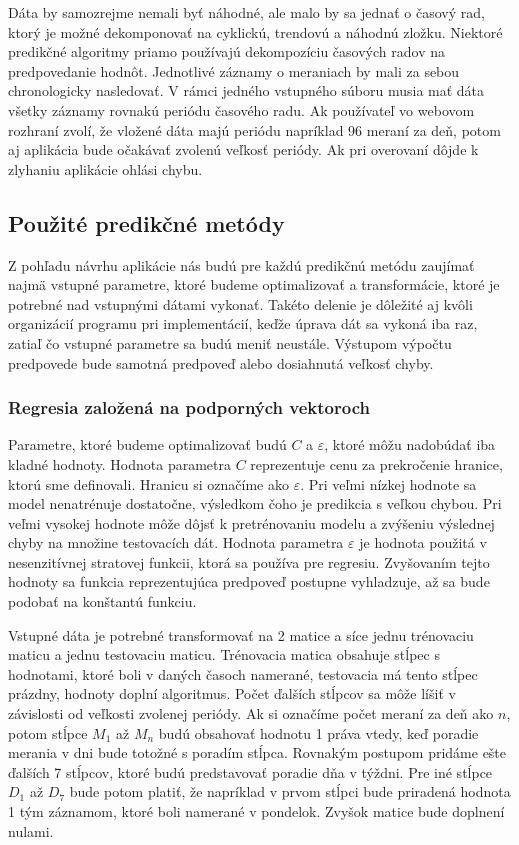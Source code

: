 \documentclass[a4paper,slovak,12pt,appendix]{article}
\begin{document}
Dáta by samozrejme nemali byť náhodné, ale malo by sa jednať o časový rad,
ktorý je možné dekomponovať na cyklickú, trendovú a náhodnú zložku. Niektoré
predikčné algoritmy priamo používajú dekompozíciu časových radov na
predpovedanie hodnôt. Jednotlivé záznamy o meraniach by mali za sebou
chronologicky nasledovať. V rámci jedného vstupného súboru musia mať dáta
všetky záznamy rovnakú periódu časového radu. Ak používateľ vo webovom rozhraní
zvolí, že vložené dáta majú periódu napríklad 96 meraní za deň, potom aj aplikácia
bude očakávať zvolenú veľkosť periódy. Ak pri overovaní dôjde k zlyhaniu
aplikácie ohlási chybu.


\subsection{Použité predikčné metódy}
Z pohľadu návrhu aplikácie nás budú pre každú predikčnú metódu zaujímať najmä
vstupné parametre, ktoré budeme optimalizovať a transformácie, ktoré je
potrebné nad vstupnými dátami vykonať. Takéto delenie je dôležité aj kvôli
organizácií programu pri implementácií, keďže úprava dát sa vykoná iba raz,
zatiaľ čo vstupné parametre sa budú meniť neustále. Výstupom výpočtu predpovede
bude samotná predpoveď alebo dosiahnutá veľkosť chyby.

\subsubsection{Regresia založená na podporných vektoroch}
Parametre, ktoré budeme optimalizovať budú $C$ a $\varepsilon$, ktoré môžu
nadobúdať iba kladné hodnoty. Hodnota parametra $C$ reprezentuje cenu za
prekročenie hranice, ktorú sme definovali. Hranicu si označíme ako $\varepsilon$.
Pri veľmi nízkej hodnote sa model nenatrénuje dostatočne, výsledkom čoho je
predikcia s veľkou chybou. Pri veľmi vysokej hodnote môže dôjsť k pretrénovaniu modelu
a zvýšeniu výslednej chyby na množine testovacích dát. Hodnota parametra
$\varepsilon$ je hodnota použitá v nesenzitívnej stratovej funkcii, ktorá sa
používa pre regresiu. Zvyšovaním tejto hodnoty sa funkcia reprezentujúca
predpoveď postupne vyhladzuje, až sa bude podobať na konštantú funkciu.

Vstupné dáta je potrebné transformovať na 2 matice a síce jednu trénovaciu maticu
a jednu testovaciu maticu. Trénovacia matica obsahuje stĺpec s hodnotami,
ktoré boli v daných časoch namerané, testovacia má tento stĺpec prázdny,
hodnoty doplní algoritmus. Počet ďalších stĺpcov sa môže líšiť
v závislosti od veľkosti zvolenej periódy. Ak si označíme počet meraní za deň
ako $n$, potom stĺpce $M_1$ až $M_n$ budú obsahovať hodnotu 1 práva vtedy,
keď poradie merania v dni bude totožné s poradím stĺpca. Rovnakým postupom
pridáme ešte ďalších 7 stĺpcov, ktoré budú predstavovať poradie dňa v týždni.
Pre iné stĺpce $D_1$ až $D_7$ bude potom platiť, že napríklad v prvom stĺpci bude
priradená hodnota 1 tým záznamom, ktoré boli namerané v pondelok. Zvyšok matice
bude doplnení nulami.
\end{document}
